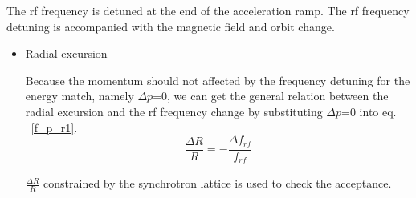 The rf frequency is detuned at the end of the acceleration ramp. The rf frequency detuning is accompanied with the magnetic field and orbit change.

\begin {itemize}
\item Radial excursion

Because the momentum should not affected by the frequency detuning for the energy match, namely $\Delta p$=0, we can get the general relation between the radial excursion and the rf frequency change by substituting $\Delta p$=0 into eq. ~\ref{f_p_r1}.
\begin{equation}
\frac{\Delta{R}}{R}= - \frac{\Delta f_{\mathit{rf}}}{f_{\mathit{rf}}} 
\label{eq:eq4}
\end{equation}

$\frac{\Delta{R}}{R}$ constrained by the synchrotron lattice is used to check the acceptance.

%
%
%
%
\end {itemize}



